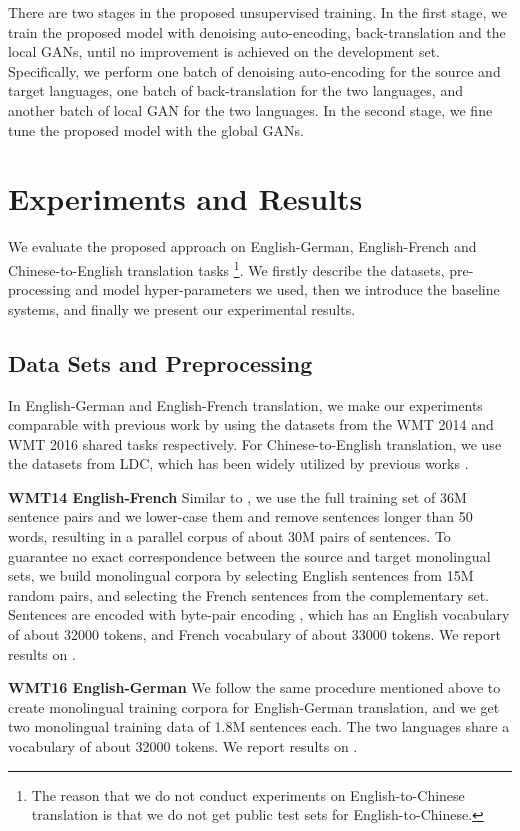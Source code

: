 \documentclass[11pt,a4paper]{article}
\begin{document}
There are two stages in the proposed unsupervised training. In the first stage, we train the proposed model with denoising auto-encoding, back-translation and the local GANs, until no improvement is achieved on the development set. Specifically, we perform one batch of denoising auto-encoding for the source and target languages, one batch of back-translation for the two languages, and another batch of local GAN for the two languages.  In the second stage, we fine tune the proposed model with the global GANs.

\section{Experiments and Results}
We evaluate the proposed approach on English-German, English-French and Chinese-to-English translation tasks \footnote{The reason that we do not conduct experiments on English-to-Chinese translation is that we do not get public test sets for English-to-Chinese.}. We firstly describe the datasets, pre-processing and model hyper-parameters we used, then we introduce the baseline systems, and finally we present our experimental results.

\subsection{Data Sets and Preprocessing}
In English-German and English-French translation, we make our experiments comparable with previous work by using the datasets from the WMT 2014 and WMT 2016 shared tasks respectively. For Chinese-to-English translation, we use the datasets from LDC, which has been widely utilized by previous works \cite{Tu2017Learning,Zhang2017Prior}.

\textbf{WMT14 English-French} Similar to \cite{Lample2017Unsupervised}, we use the full training set of 36M sentence pairs and we lower-case them and remove sentences longer than 50 words, resulting in a parallel corpus of about 30M pairs of sentences. To guarantee no exact correspondence between the source and target monolingual sets, we build monolingual corpora by selecting English sentences from 15M random pairs, and selecting the French sentences from the complementary set. Sentences are encoded with byte-pair encoding \cite{Sennrich2015Neural}, which has an English vocabulary of about 32000 tokens, and French vocabulary of about 33000 tokens. We report results on .

\textbf{WMT16 English-German} We follow the same procedure mentioned above to create monolingual training corpora for English-German translation, and we get two monolingual training data of 1.8M sentences each. The two languages share a vocabulary of about 32000 tokens. We report results on .
\end{document}
